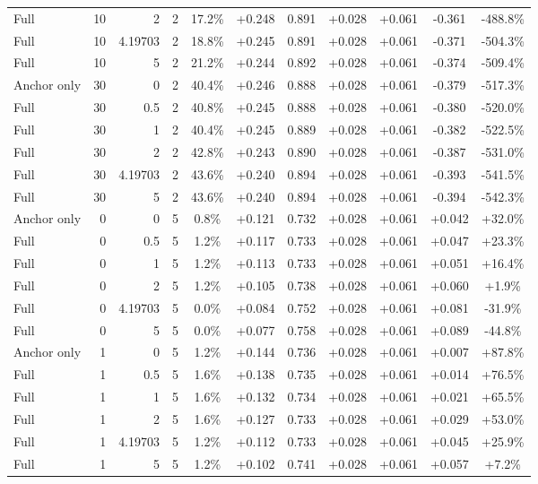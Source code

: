 \begin{table}[htbp]
\begin{tabular}{lrrrccccccc}
Full & 10 & 2 & 2 & 17.2\% & +0.248 & 0.891 & +0.028 & +0.061 & -0.361 & -488.8\% \\
Full & 10 & 4.19703 & 2 & 18.8\% & +0.245 & 0.891 & +0.028 & +0.061 & -0.371 & -504.3\% \\
Full & 10 & 5 & 2 & 21.2\% & +0.244 & 0.892 & +0.028 & +0.061 & -0.374 & -509.4\% \\
Anchor only & 30 & 0 & 2 & 40.4\% & +0.246 & 0.888 & +0.028 & +0.061 & -0.379 & -517.3\% \\
Full & 30 & 0.5 & 2 & 40.8\% & +0.245 & 0.888 & +0.028 & +0.061 & -0.380 & -520.0\% \\
Full & 30 & 1 & 2 & 40.4\% & +0.245 & 0.889 & +0.028 & +0.061 & -0.382 & -522.5\% \\
Full & 30 & 2 & 2 & 42.8\% & +0.243 & 0.890 & +0.028 & +0.061 & -0.387 & -531.0\% \\
Full & 30 & 4.19703 & 2 & 43.6\% & +0.240 & 0.894 & +0.028 & +0.061 & -0.393 & -541.5\% \\
Full & 30 & 5 & 2 & 43.6\% & +0.240 & 0.894 & +0.028 & +0.061 & -0.394 & -542.3\% \\
Anchor only & 0 & 0 & 5 & 0.8\% & +0.121 & 0.732 & +0.028 & +0.061 & +0.042 & +32.0\% \\
Full & 0 & 0.5 & 5 & 1.2\% & +0.117 & 0.733 & +0.028 & +0.061 & +0.047 & +23.3\% \\
Full & 0 & 1 & 5 & 1.2\% & +0.113 & 0.733 & +0.028 & +0.061 & +0.051 & +16.4\% \\
Full & 0 & 2 & 5 & 1.2\% & +0.105 & 0.738 & +0.028 & +0.061 & +0.060 & +1.9\% \\
Full & 0 & 4.19703 & 5 & 0.0\% & +0.084 & 0.752 & +0.028 & +0.061 & +0.081 & -31.9\% \\
Full & 0 & 5 & 5 & 0.0\% & +0.077 & 0.758 & +0.028 & +0.061 & +0.089 & -44.8\% \\
Anchor only & 1 & 0 & 5 & 1.2\% & +0.144 & 0.736 & +0.028 & +0.061 & +0.007 & +87.8\% \\
Full & 1 & 0.5 & 5 & 1.6\% & +0.138 & 0.735 & +0.028 & +0.061 & +0.014 & +76.5\% \\
Full & 1 & 1 & 5 & 1.6\% & +0.132 & 0.734 & +0.028 & +0.061 & +0.021 & +65.5\% \\
Full & 1 & 2 & 5 & 1.6\% & +0.127 & 0.733 & +0.028 & +0.061 & +0.029 & +53.0\% \\
Full & 1 & 4.19703 & 5 & 1.2\% & +0.112 & 0.733 & +0.028 & +0.061 & +0.045 & +25.9\% \\
Full & 1 & 5 & 5 & 1.2\% & +0.102 & 0.741 & +0.028 & +0.061 & +0.057 & +7.2\% \\

\end{tabular}
\end{table}
